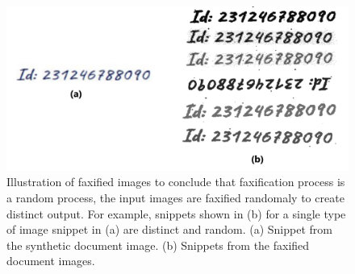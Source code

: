 \begin{figure}[H]
        \begin{center}
	    \includegraphics[scale=0.15]{images/FaxificationProcessZoomed.jpg}
	    \caption[Illustration of faxified images.]{Illustration of faxified images to conclude that faxification process is a random process, the input images are faxified randomaly to create distinct output. For example, snippets shown in (b) for a single type of image snippet in (a) are distinct and random. (a) Snippet from the synthetic document image. (b) Snippets from the faxified document images.}
	    \label{fig:FaxificationProcessZoomed}
	    \end{center}
\end{figure}





